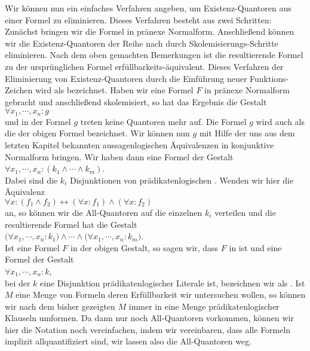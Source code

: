 Wir können nun ein einfaches Verfahren angeben, um Existenz-Quantoren aus einer Formel
zu eliminieren.  Dieses Verfahren besteht aus zwei Schritten:  Zunächst bringen wir die Formel
in pränexe Normalform. Anschließend können wir die Existenz-Quantoren der Reihe nach durch 
Skolemisierungs-Schritte eliminieren.  Nach dem oben gemachten Bemerkungen ist die resultierende 
Formel zu der ursprünglichen Formel erfüllbarkeits-äquivalent.  Dieses
Verfahren der Eliminierung von Existenz-Quantoren durch die Einführung neuer
Funktions-Zeichen wird als  bezeichnet.  Haben wir eine Formel $F$
in pränexe Normalform gebracht und anschließend skolemisiert, so hat das Ergebnis die Gestalt\\[0.2cm]
\hspace*{1.3cm} $\forall x_1, \cdots, x_n: g$ \\[0.2cm]
und in der Formel $g$ treten keine Quantoren mehr auf.  Die Formel $g$ wird auch als die
 der obigen Formel bezeichnet.  Wir können nun  $g$ mit Hilfe
der uns aus dem letzten Kapitel bekannten aussagenlogischen
 Äquivalenzen in konjunktive Normalform bringen.  Wir haben dann eine
Formel der Gestalt \\[0.2cm]
\hspace*{1.3cm} $\forall x_1, \cdots, x_n: (k_1 \wedge \cdots \wedge k_m)$. \\[0.2cm]
Dabei sind die $k_i$ Disjunktionen von prädikatenlogischen .  Wenden wir
hier  die Äquivalenz 
\\[0.2cm]
\hspace*{1.3cm}
$\forall x\colon (f_1\wedge f_2) \leftrightarrow (\forall x\colon f_1) \wedge (\forall x\colon f_2)$
\\[0.2cm]
an, so können wir die All-Quantoren auf die einzelnen $k_i$ verteilen und
die resultierende Formel hat die Gestalt \\[0.2cm]
\hspace*{1.3cm} 
$\big(\forall x_1, \cdots, x_n: k_1\big) \wedge \cdots \wedge \big(\forall x_1, \cdots, x_n: k_m\big)$. \\[0.2cm]
Ist eine Formel $F$ in der obigen
Gestalt, so sagen wir, dass $F$ in  ist und eine
Formel der Gestalt \\[0.2cm]
\hspace*{1.3cm} $\forall x_1, \cdots, x_n: k$, \\[0.2cm]
bei der $k$ eine Disjunktion prädikatenlogischer Literale ist,
bezeichnen wir als .  Ist $M$
eine Menge von Formeln deren Erfüllbarkeit wir untersuchen wollen, so können wir nach dem
bisher gezeigten $M$ immer in eine Menge prädikatenlogischer Klauseln umformen.
Da  dann nur noch All-Quantoren vorkommen, können wir hier die  Notation noch vereinfachen,
indem wir vereinbaren, dass alle Formeln implizit allquantifiziert sind, wir lassen also
die All-Quantoren weg.

